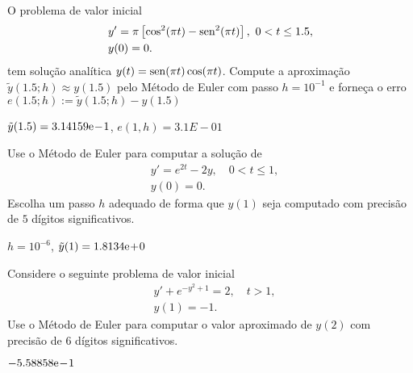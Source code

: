 \begin{exer}
  O problema de valor inicial
  \begin{subequations}
    \begin{align}
      &y' = \pi\left[\cos^2(\pi t) - \operatorname{sen}^2(\pi t)\right], ~0 < t \leq 1.5,\\
      &y(0) = 0.
    \end{align}
  \end{subequations}
  tem solução analítica $y(t) = \operatorname{sen}(\pi t)\cos(\pi t)$. Compute a aproximação $\tilde{y}(1.5; h) \approx y(1.5)$ pelo Método de Euler com passo $h=10^{-1}$ e forneça o erro $e(1.5; h) := \tilde{y}(1.5; h) - y(1.5)$
\end{exer}
\begin{resp}
  $\tilde{y}(1.5) = 3.14159\mathrm{e}\!-\!1$, $e(1, h) = 3.1E-01$
\end{resp}

\begin{exer}
  Use o Método de Euler para computar a solução de
  \begin{subequations}
    \begin{align}
      &y' = e^{2t} - 2y,\quad 0 < t\leq 1,\\
      &y(0) = 0.
    \end{align}
  \end{subequations}
  Escolha um passo $h$ adequado de forma que $y(1)$ seja computado com precisão de $5$ dígitos significativos.
\end{exer}
\begin{resp}
  $h=10^{-6}$, $\tilde{y}(1) = 1.8134\mathrm{e}\!+\!0$
\end{resp}

\begin{exer}
  Considere o seguinte problema de valor inicial
  \begin{subequations}
    \begin{align}
      &y' + e^{-y^2+1} = 2,\quad t>1,\\
      &y(1) = -1.
    \end{align}
\end{subequations}
Use o Método de Euler para computar o valor aproximado de $y(2)$ com precisão de $6$ dígitos significativos.
\end{exer}
\begin{resp}
  $-5.58858\mathrm{e}\!-\!1$
\end{resp}

